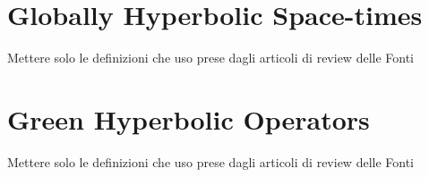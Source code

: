 \documentclass[Main]{subfiles}
\begin{document}
	\section{Globally Hyperbolic Space-times}
			\begin{Warning}
				Mettere solo le definizioni che uso prese dagli articoli di review delle Fonti
			\end{Warning}	
							
			
		\section{Green Hyperbolic Operators}
			\begin{Warning}
				Mettere solo le definizioni che uso prese dagli articoli di review delle Fonti
		\end{Warning}	
				
				
\end{document}
